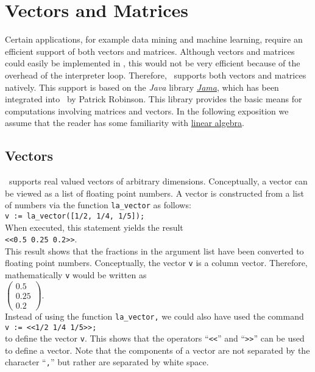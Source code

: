 \chapter{Vectors and Matrices \label{chapter:linear-algebra.tex}}
Certain applications, for example data mining and machine learning, require an efficient support of both
vectors and matrices. 
Although vectors and matrices could easily be implemented in \setlx, this would not be very
efficient because of the overhead of the interpreter loop.  Therefore, \setlx\ supports both vectors and
matrices natively.  This support is based on the \textsl{Java} library 
\href{http://math.nist.gov/javanumerics/jama/}{\textsl{Jama}}, which has been integrated into
\setlx\ by Patrick Robinson.  This library provides the basic means for computations involving
matrices and vectors.  In the following exposition we assume that the reader has some familiarity with  
\href{http://en.wikipedia.org/wiki/Linear_algebra}{linear algebra}.

\section{Vectors}
\setlx\ supports real valued vectors of arbitrary dimensions.  Conceptually, a vector can be viewed as
a list of floating point numbers.  A vector is constructed from a list of numbers via the
function \texttt{la\_vector} as follows:
\\[0.2cm]
\hspace*{1.3cm}
\texttt{v := la\_vector([1/2, 1/4, 1/5]);}
\\[0.2cm]
When executed, this statement yields the result
\\[0.2cm]
\hspace*{1.3cm}
\texttt{<<0.5 0.25 0.2>>}.
\\[0.2cm]
This result shows that the fractions in the argument list have been converted to floating point
numbers.  Conceptually, the vector \texttt{v} is a column vector.  Therefore, mathematically
\texttt{v} would be written as
\\[0.2cm]
\hspace*{1.3cm}
$
\left(\begin{array}{l}
  0.5  \\
  0.25 \\
  0.2
\end{array}\right)
$.
\\[0.2cm]
Instead of using the function \texttt{la\_vector,} we could also have used the command
\\[0.2cm]
\hspace*{1.3cm}
\texttt{v := <<1/2 1/4 1/5>>;}
\\[0.2cm]
to define the vector \texttt{v}.  This shows that the operators ``\texttt{<<}'' and ``\texttt{>>}''
can be used to define a vector.  Note that the components of a vector are not separated by the
character ``\texttt{,}'' but rather are separated by white space.

